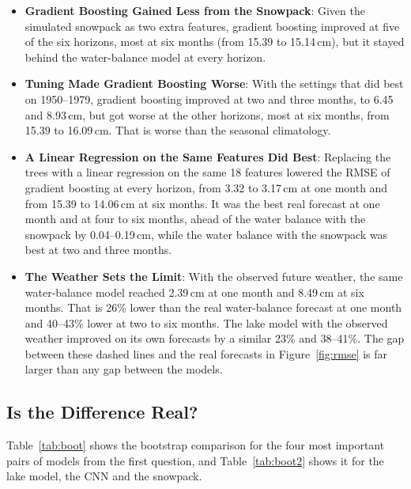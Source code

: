 \documentclass{article}
\begin{document}
\begin{itemize}
at six months.
\item \textbf{Gradient Boosting Gained Less from the Snowpack}: Given the simulated snowpack as two
extra features, gradient boosting improved at five of the six horizons, most at six months (from
15.39 to 15.14\,cm), but it stayed behind the water-balance model at every horizon.
\item \textbf{Tuning Made Gradient Boosting Worse}: With the settings that did best on 1950--1979,
gradient boosting improved at two and three months, to 6.45 and 8.93\,cm, but got worse at the
other horizons, most at six months, from 15.39 to 16.09\,cm. That is worse than the seasonal
climatology.
\item \textbf{A Linear Regression on the Same Features Did Best}: Replacing the trees with a linear
regression on the same 18 features lowered the RMSE of gradient boosting at every horizon, from
3.32 to 3.17\,cm at one month and from 15.39 to 14.06\,cm at six months. It was the best real
forecast at one month and at four to six months, ahead of the water balance with the snowpack by
0.04--0.19\,cm, while the water balance with the snowpack was best at two and three months.
\item \textbf{The Weather Sets the Limit}: With the observed future weather, the same
water-balance model reached 2.39\,cm at one month and 8.49\,cm at six months. That is 26\% lower
than the real water-balance forecast at one month and 40--43\% lower at two to six months. The
lake model with the observed weather improved on its own forecasts by a similar 23\% and
38--41\%. The gap between these dashed lines and the real forecasts in Figure~\ref{fig:rmse} is
far larger than any gap between the models.
\end{itemize}

\subsection{Is the Difference Real?}

Table~\ref{tab:boot} shows the bootstrap comparison for the four most important pairs of models
from the first question, and Table~\ref{tab:boot2} shows it for the lake model, the CNN and the
snowpack.
\end{document}
